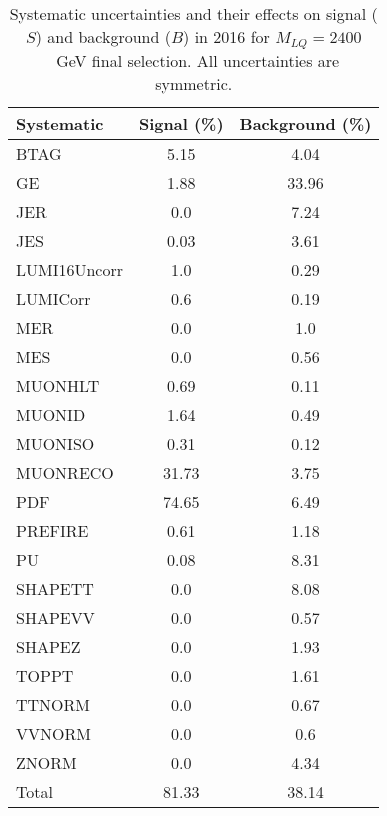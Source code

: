 \begin{table}[htbp]
\begin{center}
\caption{Systematic uncertainties and their effects on signal ($S$) and background ($B$) in 2016 for $M_{LQ}=2400$~GeV final selection. All uncertainties are symmetric.}
\begin{tabular}{lcc}
\hline\hline
Systematic & Signal (\%) & Background (\%) \\ \hline 
BTAG & 5.15 & 4.04\\ 
GE & 1.88 & 33.96\\ 
JER & 0.0 & 7.24\\ 
JES & 0.03 & 3.61\\ 
LUMI16Uncorr & 1.0 & 0.29\\ 
LUMICorr & 0.6 & 0.19\\ 
MER & 0.0 & 1.0\\ 
MES & 0.0 & 0.56\\ 
MUONHLT & 0.69 & 0.11\\ 
MUONID & 1.64 & 0.49\\ 
MUONISO & 0.31 & 0.12\\ 
MUONRECO & 31.73 & 3.75\\ 
PDF & 74.65 & 6.49\\ 
PREFIRE & 0.61 & 1.18\\ 
PU & 0.08 & 8.31\\ 
SHAPETT & 0.0 & 8.08\\ 
SHAPEVV & 0.0 & 0.57\\ 
SHAPEZ & 0.0 & 1.93\\ 
TOPPT & 0.0 & 1.61\\ 
TTNORM & 0.0 & 0.67\\ 
VVNORM & 0.0 & 0.6\\ 
ZNORM & 0.0 & 4.34\\ 
Total & 81.33 & 38.14\\ \hline \hline
\end{tabular}
\label{tab:SysUncertainties_uujj_2400}
\end{center}
\end{table}

